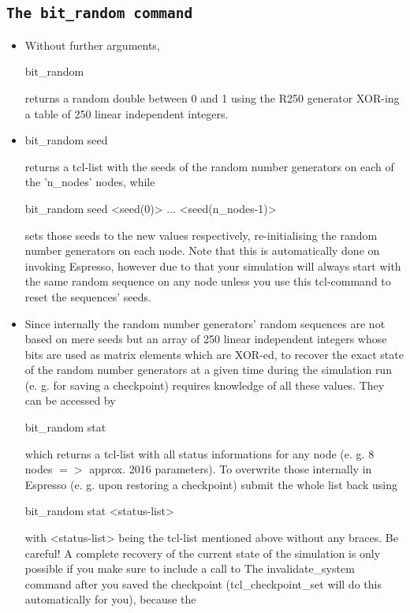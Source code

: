 \subsection{\texttt{The bit\_random command}}
\label{ssec:bitrandom}
\begin{itemize}
 \item
  Without further arguments,
\begin{code}
bit\_random
\end{code}
returns a random double between 0 and 1 using the R250 generator
XOR-ing a table of 250 linear independent integers.
 \item
\begin{code}
bit\_random seed
\end{code}
returns a tcl-list with the seeds of the random number generators on
each of the 'n\_nodes' nodes, while
\begin{code}
bit\_random seed <seed(0)> ... <seed(n\_nodes-1)>
\end{code}
sets those seeds to the new values respectively, re-initialising the
random number generators on each node.  Note that this is
automatically done on invoking Espresso, however due to that your
simulation will always start with the same random sequence on any node
unless you use this tcl-command to reset the sequences' seeds.
\item Since internally the random number generators' random sequences
  are not based on mere seeds but an array of 250 linear independent
  integers whose bits are used as matrix elements which are XOR-ed, to
  recover the exact state of the random number generators at a given
  time during the simulation run (e. g. for saving a checkpoint)
  requires knowledge of all these values. They can be accessed by
\begin{code}
bit\_random stat
\end{code}
which returns a tcl-list with all status informations for any node (e.
g. 8 nodes $=>$ approx. 2016 parameters). To overwrite those
internally in Espresso (e. g. upon restoring a checkpoint) submit the
whole list back using
\begin{code}
bit\_random stat <status-list>
\end{code}
with <status-list> being the tcl-list mentioned above without any
braces.  Be careful! A complete recovery of the current state of the
simulation is only possible if you make sure to include a call to The
invalidate\_system command after you saved the checkpoint
(tcl\_checkpoint\_set will do this automatically for you), because the

\end{itemize}
